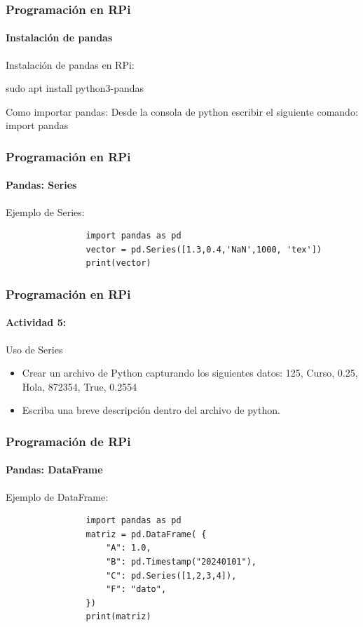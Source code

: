 \documentclass{beamer}
\begin{document}
	\begin{frame}[fragile]
		\frametitle{Programación en RPi}
		\framesubtitle{Instalación de pandas}
		\begin{mybox}{Instalación de pandas en RPi:}
			
				sudo apt install python3-pandas
			
		\end{mybox}
		\begin{mybox}{Como importar pandas:}
			Desde la consola de python escribir el siguiente comando:
			\newline
			import pandas
			
		\end{mybox}
	\end{frame}
	
	\begin{frame}[fragile]
		\frametitle{Programación en RPi}
		\framesubtitle{Pandas: Series}
		\begin{mybox}{Ejemplo de Series:}
			\begin{lstlisting}
				import pandas as pd
				vector = pd.Series([1.3,0.4,'NaN',1000, 'tex'])
				print(vector)
			\end{lstlisting}
		\end{mybox}
	\end{frame}
	\begin{frame}
		\frametitle{Programación en RPi}
		\framesubtitle{Actividad 5:}
		\begin{mybox}{Uso de Series}
			\begin{itemize}
				\item Crear un archivo de Python capturando los siguientes datos: 125, Curso, 0.25, Hola, 872354, True, 0.2554
				\item Escriba una breve descripción dentro del archivo de python.
			\end{itemize}
		\end{mybox}
	\end{frame}
	\begin{frame}[fragile]
		\frametitle{Programación de RPi}
		\framesubtitle{Pandas: DataFrame}
		\begin{mybox}{Ejemplo de DataFrame:}
			\begin{lstlisting}
				import pandas as pd
				matriz = pd.DataFrame( {
					"A": 1.0,
					"B": pd.Timestamp("20240101"),
					"C": pd.Series([1,2,3,4]),
					"F": "dato",
				})
				print(matriz)
			\end{lstlisting}
		\end{mybox}
	\end{frame}
	
\end{document}
